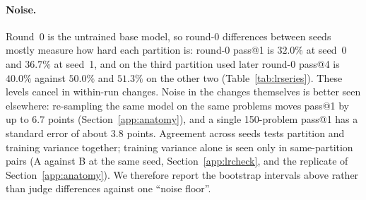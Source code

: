 \documentclass[runningheads]{llncs}
\begin{document}
\paragraph{Noise.}
Round~0 is the untrained base model, so round-0 differences between seeds
mostly measure how hard each partition is: round-0 pass@1 is $32.0\%$ at
seed~0 and $36.7\%$ at seed~1, and on the third partition used later round-0
pass@4 is $40.0\%$ against $50.0\%$ and $51.3\%$ on the other two
(Table~\ref{tab:lrseries}). These levels cancel in within-run changes. Noise in
the changes themselves is better seen elsewhere: re-sampling the same model on
the same problems moves pass@1 by up to $6.7$ points
(Section~\ref{app:anatomy}), and a single 150-problem pass@1 has a standard
error of about $3.8$ points. Agreement across seeds tests partition and
training variance together; training variance alone is seen only in
same-partition pairs (A against B at the same seed, Section~\ref{app:lrcheck},
and the replicate of Section~\ref{app:anatomy}). We therefore report the
bootstrap intervals above rather than judge differences against one ``noise
floor''.
\begin{table}[!htb]
\caption{All runs (Qwen2.5-1.5B-Instruct unless stated). Design~P was run once
per model. ``Pool'' is the round-0 kept pool (training examples; optimizer
steps are half of it).}
\label{tab:inventory}
\centering
\footnotesize
\setlength{\tabcolsep}{3pt}
\end{table}
\end{document}
